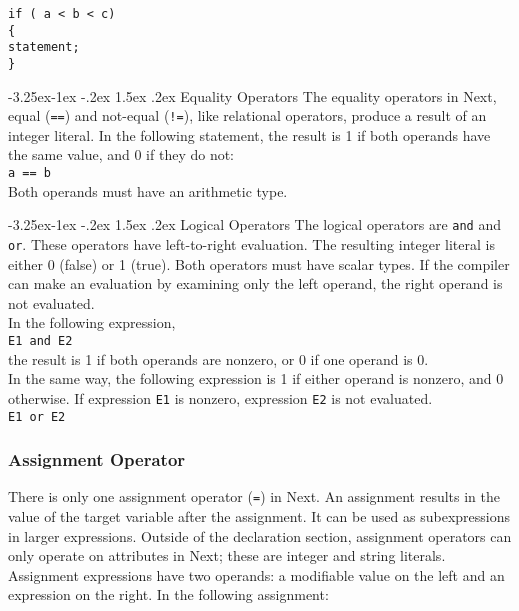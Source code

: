 \documentclass[12pt]{article}
\makeatletter
\renewcommand\paragraph{\@startsection{paragraph}{4}{\z@}%
  {-3.25ex\@plus -1ex \@minus -.2ex}%
  {1.5ex \@plus .2ex}%
  {\normalfont\normalsize\bfseries}}
\makeatother
\begin{document}
\texttt{if ( a < b < c) \\
\indent \{ \\
\indent \indent statement; \\
\indent \} }

\paragraph{Equality Operators}
The equality operators in Next, equal (\texttt{==}) and not-equal (\texttt{!=}), like relational operators, produce a result of an integer literal.  In the following statement, the result is 1 if both operands have the same value, and 0 if they do not: \\

\texttt{a == b} \\

\noindent  Both operands must have an arithmetic type.

\paragraph{Logical Operators}
The logical operators are \texttt{and} and \texttt{or}.  These operators have left-to-right evaluation.  The resulting integer literal is either 0 (false) or 1 (true).  Both operators must have scalar types.  If the compiler can make an evaluation by examining only the left operand, the right operand is not evaluated. \\

\noindent In the following expression, \\

\texttt{E1 and E2} \\

\noindent the result is 1 if both operands are nonzero, or 0 if one operand is 0.\\

\noindent In the same way, the following expression is 1 if either operand is nonzero, and 0 otherwise.  If expression \texttt{E1} is nonzero, expression \texttt{E2} is not evaluated. \\

\texttt{E1 or E2}

\subsubsection{Assignment Operator}
There is only one assignment operator (\texttt{=}) in Next.  An assignment results in the value of the target variable after the assignment.  It can be used as subexpressions in larger expressions.  Outside of the declaration section, assignment operators can only operate on attributes in Next; these are integer and string literals.  Assignment expressions have two operands: a modifiable value on the left and an expression on the right.  In the following assignment: \\
\end{document}
